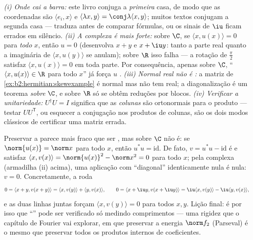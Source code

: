\begin{remark}
\emph{(i) Onde cai a barra:} este livro conjuga a
\emph{primeira} casa, de modo que as coordenadas são $\langle e_i, x\rangle$
e $\langle\lambda x, y\rangle = \conj\lambda\langle x,
y\rangle$; muitos textos conjugam a segunda casa ---
traduza antes de comparar fórmulas, ou os sinais de $\iu$ ficam
errados em silêncio. \emph{(ii) A  complexa é mais forte:}
sobre $\C$, se $\langle x, u(x)\rangle = 0$ para \emph{todo} $x$,
então $u = 0$ (desenvolva $x + y$ e $x + \iu y$: tanto a parte
real quanto a imaginária de $\langle x, u(y)\rangle$ se anulam); sobre
$\R$ isso falha --- a rotação de $\frac\pi2$ satisfaz
$\langle x, u(x)\rangle = 0$ em toda parte. Por consequência, apenas sobre
$\C$, ``$\langle x, u(x)\rangle \in \R$ para todo $x$''
já força $u$ . \emph{(iii) Normal real não é
:} a matriz de
\cref{ex:b2:hermitian:skewexample} é normal mas não tem 
real; a diagonalização  é um teorema \emph{sobre}
$\C$, e sobre $\R$ só se obtêm reduções por blocos.
\emph{(iv) Verificar a unitariedade:} $U^\dagger U = I$ significa que as
\emph{colunas} são ortonormais para o produto  ---
testar $UU^{\mathsf T}$, ou esquecer a conjugação nos
produtos de colunas, são os dois modos clássicos de certificar uma matriz
errada.
\end{remark}

\begin{example}\label{ex:b2:hermitian:isometry}
Preservar a  parece mais fraco que ser , mas sobre $\C$ não
é: se $\norm{u(x)} = \norm x$ para todo $x$, então $u^*u =
\mathrm{id}$. De fato, $v = u^*u - \mathrm{id}$ é  e
satisfaz $\langle x, v(x)\rangle = \norm{u(x)}^2 - \norm x^2 =
0$ para todo $x$; pela  complexa (armadilha (ii)
acima), uma aplicação com ``diagonal'' identicamente nula é nula:
$v = 0$. Concretamente, a  roda
\[
0 = \langle x + y, v(x+y)\rangle
= \langle x, v(y)\rangle + \langle y, v(x)\rangle,
\qquad
0 = \langle x + \iu y, v(x + \iu y)\rangle
= \iu\langle x, v(y)\rangle - \iu\langle y, v(x)\rangle ,
\]
e as duas linhas juntas forçam $\langle x, v(y)\rangle = 0$
para todos $x, y$. Lição final: é por isso que ``'' pode
ser verificado só medindo comprimentos --- uma rigidez que o
capítulo de Fourier vai explorar, em que preservar a energia
$\norm f_2$ (Parseval) é o mesmo que preservar todos os produtos
internos de coeficientes.
\end{example}

